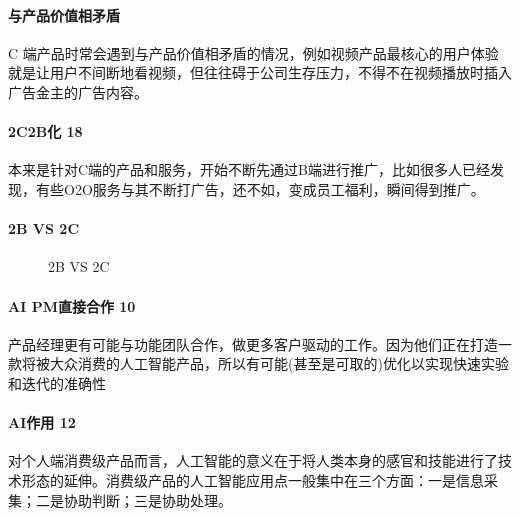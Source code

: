 \documentclass[letterpaper,10pt,english]{sphinxmanual}
\begin{document}
\paragraph{与产品价值相矛盾}
\label{\detokenize{chapter_introduction/2C:id26}}
C
端产品时常会遇到与产品价值相矛盾的情况，例如视频产品最核心的用户体验就是让用户不间断地看视频，但往往碍于公司生存压力，不得不在视频播放时插入广告金主的广告内容。


\paragraph{2C2B化 18\sphinxfootnotemark[122]}
\label{\detokenize{chapter_introduction/2C:c2b-18}}%
\begin{footnotetext}[122]\sphinxAtStartFootnote
{}
%
\end{footnotetext}\ignorespaces 
本来是针对C端的产品和服务，开始不断先通过B端进行推广，比如很多人已经发现，有些O2O服务与其不断打广告，还不如，变成员工福利，瞬间得到推广。


\paragraph{2B VS 2C}
\label{\detokenize{chapter_introduction/2C:b-vs-2c}}\label{\detokenize{chapter_introduction/2C:id27}}
\begin{figure}[H]
\centering
\capstart

\noindent{}
\caption{2B VS 2C}\label{\detokenize{chapter_introduction/2C:id30}}\end{figure}


\paragraph{AI PM直接合作 10\sphinxfootnotemark[123]}
\label{\detokenize{chapter_introduction/2C:ai-pm-10}}%
\begin{footnotetext}[123]\sphinxAtStartFootnote
{}
%
\end{footnotetext}\ignorespaces 
产品经理更有可能与功能团队合作，做更多客户驱动的工作。因为他们正在打造一款将被大众消费的人工智能产品，所以有可能(甚至是可取的)优化以实现快速实验和迭代的准确性


\paragraph{AI作用 12\sphinxfootnotemark[124]}
\label{\detokenize{chapter_introduction/2C:ai-12}}%
\begin{footnotetext}[124]\sphinxAtStartFootnote
{}
%
\end{footnotetext}\ignorespaces 
对个人端消费级产品而言，人工智能的意义在于将人类本身的感官和技能进行了技术形态的延伸。消费级产品的人工智能应用点一般集中在三个方面：一是信息采集；二是协助判断；三是协助处理。
\end{document}
